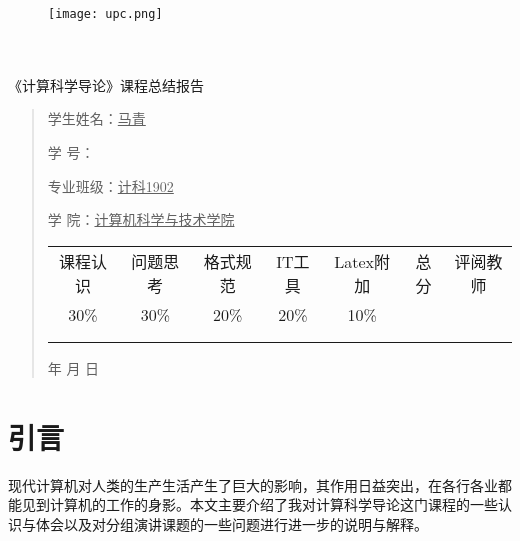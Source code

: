 \documentclass{article}
\renewcommand{\today}{\number\year 年 \number\month 月 \number\day 日}
\begin{document}
\begin{figure}
    \centering
    \texttt{[image: upc.png]}

    \label{figupc}
\end{figure}

	\begin{center}
		\quad \\
		\quad \\
		\heiti \fontsize{45}{17} \quad \quad \quad 
		\vskip 1.5cm
		\heiti {} 《计算科学导论》课程总结报告
	\end{center}
	\vskip 2.0cm
		
	\begin{quotation}
		\doublespacing
		
        \par\setlength\parindent{7em}
		\quad 

		学生姓名：\underline{\qquad  马青 \qquad \qquad}

		学\hspace{0.61cm} 号：\underline{\qquad}
		
		专业班级：\underline{\qquad 计科1902 \qquad  }
		
        学\hspace{0.61cm} 院：\underline{计算机科学与技术学院}
		\vskip 2cm
		\centering
		\begin{table}[h]
            \centering 
            \begin{tabular}{|c|c|c|c|c|c|c|}
                \hline
                课程认识 & 问题思 考 & 格式规范  & IT工具  & Latex附加  & 总分 & 评阅教师 \\
                30\% & 30\% & 20\% & 20\% & 10\% &  &  \\
                \hline
                 & & & & & &\\
                & & & & & &\\
                \hline
            \end{tabular}
        \end{table}
		\vskip 2cm
		\today
	\end{quotation}

\thispagestyle{empty}
\newpage
\setcounter{page}{1}
\section{引言}
现代计算机对人类的生产生活产生了巨大的影响，其作用日益突出，在各行各业都能见到计算机的工作的身影。本文主要介绍了我对计算科学导论这门课程的一些认识与体会以及对分组演讲课题的一些问题进行进一步的说明与解释。\par
\end{document}
